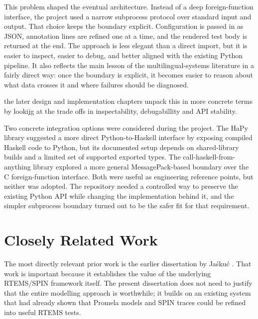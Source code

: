 This problem shaped the eventual architecture. Instead of a deep foreign-function interface, the project used a narrow subprocess protocol over standard input and output. That choice keeps the boundary explicit. Configuration is passed in as JSON, annotation lines are refined one at a time, and the rendered test body is returned at the end. The approach is less elegant than a direct import, but it is easier to inspect, easier to debug, and better aligned with the existing Python pipeline. It also reflects the main lesson of the multilingual-systems literature in a fairly direct way: once the boundary is explicit, it becomes easier to reason about what data crosses it and where failures should be diagnosed.

the later design and implementation chapters unpack this in more concrete terms by lookijg at the trade offs in inspectability, debugabillity and API stability.


Two concrete integration options were considered during the project. The HaPy library \citep{fisher2014hapy} suggested a more direct Python-to-Haskell interface by exposing compiled Haskell code to Python, but its documented setup depends on shared-library builds and a limited set of supported exported types. The call-haskell-from-anything library \citep{hambuechen2011callhaskell} explored a more general MessagePack-based boundary over the C foreign-function interface.  Both were useful as engineering reference points, but neither was adopted. The repository needed a controlled way to preserve the existing Python API while changing the implementation behind it, and the simpler subprocess boundary turned out to be the safer fit for that requirement.


\section{Closely Related Work}

The most directly relevant prior work is the earlier dissertation by Ja{\'s}ku{\'c} \citep{jaskuc2022barrier}. That work is important because it establishes the value of the underlying RTEMS/SPIN framework itself. The present dissertation does not need to justify that the entire modelling approach is worthwhile; it builds on an existing system that had already shown that Promela models and SPIN traces could be refined into useful RTEMS tests.

